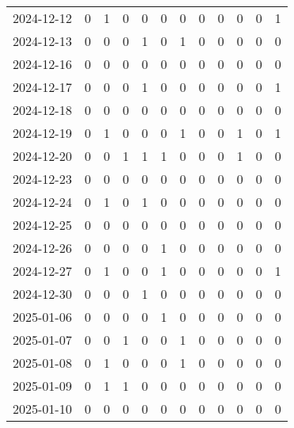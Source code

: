 \documentclass[dvipdfmx,oneside]{article}
\begin{document}
\begin{tabular}{lccccccccccc}
        2024-12-12 &     0 &     1 &     0 &     0 &     0 &     0 &     0 &     0 &     0 &     0 &     1 \\
        2024-12-13 &     0 &     0 &     0 &     1 &     0 &     1 &     0 &     0 &     0 &     0 &     0 \\
        2024-12-16 &     0 &     0 &     0 &     0 &     0 &     0 &     0 &     0 &     0 &     0 &     0 \\
        2024-12-17 &     0 &     0 &     0 &     1 &     0 &     0 &     0 &     0 &     0 &     0 &     1 \\
        2024-12-18 &     0 &     0 &     0 &     0 &     0 &     0 &     0 &     0 &     0 &     0 &     0 \\
        2024-12-19 &     0 &     1 &     0 &     0 &     0 &     1 &     0 &     0 &     1 &     0 &     1 \\
        2024-12-20 &     0 &     0 &     1 &     1 &     1 &     0 &     0 &     0 &     1 &     0 &     0 \\
        2024-12-23 &     0 &     0 &     0 &     0 &     0 &     0 &     0 &     0 &     0 &     0 &     0 \\
        2024-12-24 &     0 &     1 &     0 &     1 &     0 &     0 &     0 &     0 &     0 &     0 &     0 \\
        2024-12-25 &     0 &     0 &     0 &     0 &     0 &     0 &     0 &     0 &     0 &     0 &     0 \\
        2024-12-26 &     0 &     0 &     0 &     0 &     1 &     0 &     0 &     0 &     0 &     0 &     0 \\
        2024-12-27 &     0 &     1 &     0 &     0 &     1 &     0 &     0 &     0 &     0 &     0 &     1 \\
        2024-12-30 &     0 &     0 &     0 &     1 &     0 &     0 &     0 &     0 &     0 &     0 &     0 \\
        2025-01-06 &     0 &     0 &     0 &     0 &     1 &     0 &     0 &     0 &     0 &     0 &     0 \\
        2025-01-07 &     0 &     0 &     1 &     0 &     0 &     1 &     0 &     0 &     0 &     0 &     0 \\
        2025-01-08 &     0 &     1 &     0 &     0 &     0 &     1 &     0 &     0 &     0 &     0 &     0 \\
        2025-01-09 &     0 &     1 &     1 &     0 &     0 &     0 &     0 &     0 &     0 &     0 &     0 \\
        2025-01-10 &     0 &     0 &     0 &     0 &     0 &     0 &     0 &     0 &     0 &     0 &     0 \\

\end{tabular}
\end{document}
